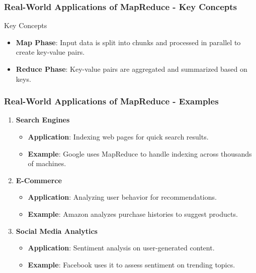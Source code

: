 \documentclass[aspectratio=169]{beamer}
\begin{document}
\begin{frame}[fragile]
    \frametitle{Real-World Applications of MapReduce - Key Concepts}
    \begin{block}{Key Concepts}
        \begin{itemize}
            \item \textbf{Map Phase}: Input data is split into chunks and processed in parallel to create key-value pairs.
            \item \textbf{Reduce Phase}: Key-value pairs are aggregated and summarized based on keys.
        \end{itemize}
    \end{block}
\end{frame}

\begin{frame}[fragile]
    \frametitle{Real-World Applications of MapReduce - Examples}
    \begin{enumerate}
        \item \textbf{Search Engines}
            \begin{itemize}
                \item \textbf{Application}: Indexing web pages for quick search results.
                \item \textbf{Example}: Google uses MapReduce to handle indexing across thousands of machines.
            \end{itemize}
        
        \item \textbf{E-Commerce}
            \begin{itemize}
                \item \textbf{Application}: Analyzing user behavior for recommendations.
                \item \textbf{Example}: Amazon analyzes purchase histories to suggest products.
            \end{itemize}

        \item \textbf{Social Media Analytics}
            \begin{itemize}
                \item \textbf{Application}: Sentiment analysis on user-generated content.
                \item \textbf{Example}: Facebook uses it to assess sentiment on trending topics.
            \end{itemize}
    \end{enumerate}
\end{frame}
\end{document}
